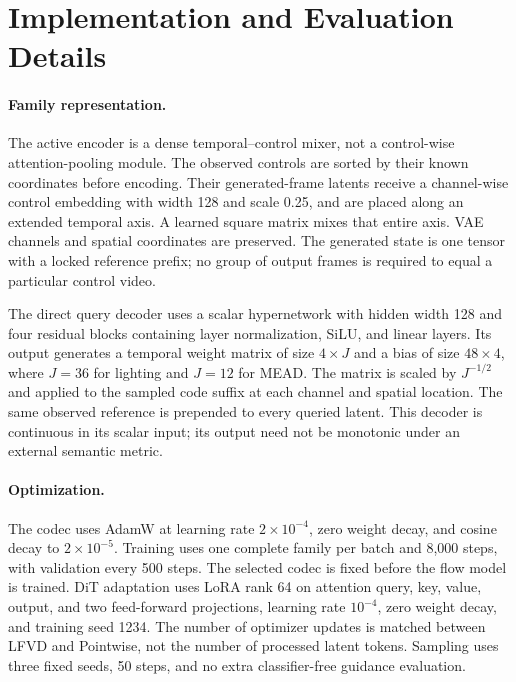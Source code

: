 \section{Implementation and Evaluation Details}
\label{sec:supp_impl}
\paragraph{Family representation.}
The active encoder is a dense temporal--control mixer, not a control-wise
attention-pooling module. The observed controls are sorted by their known
coordinates before encoding. Their generated-frame latents receive a
channel-wise control embedding with width 128 and scale 0.25, and are placed
along an extended temporal axis. A learned square matrix mixes that entire
axis. VAE channels and spatial coordinates are preserved. The generated state
is one tensor with a locked reference prefix; no group of output frames is
required to equal a particular control video.

The direct query decoder uses a scalar hypernetwork with hidden width 128
and four residual blocks containing layer normalization, SiLU, and linear
layers. Its output generates a temporal weight matrix of size
$4\times J$ and a bias of size $48\times4$, where $J=36$ for lighting and
$J=12$ for MEAD. The matrix is scaled by $J^{-1/2}$ and applied to the sampled
code suffix at each channel and spatial location. The same observed reference
is prepended to every queried latent. This decoder is continuous in its scalar
input; its output need not be monotonic under an external semantic metric.

\paragraph{Optimization.}
The codec uses AdamW at learning rate $2\times10^{-4}$, zero weight decay,
and cosine decay to $2\times10^{-5}$. Training uses one complete family per
batch and 8,000 steps, with validation every 500 steps. The selected codec is
fixed before the flow model is trained. DiT adaptation uses LoRA rank 64 on
attention query, key, value, output, and two feed-forward projections, learning
rate $10^{-4}$, zero weight decay, and training seed 1234. The number of
optimizer updates is matched between LFVD and Pointwise, not the number
of processed latent tokens. Sampling uses three fixed seeds, 50 steps, and
no extra classifier-free guidance evaluation.

